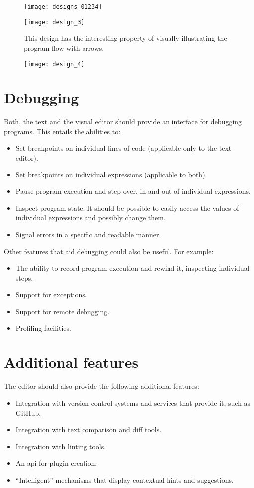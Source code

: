 \begin{figure}[h!]
\centering \texttt{[image: designs\_01234]}
\caption{}
\label{fig:designs_01234}
\end{figure}

\begin{figure}[h!]
\centering \texttt{[image: design\_3]}
\caption{This design has the interesting property of visually illustrating the
  program flow with arrows.}
\label{fig:design_3}
\end{figure}

\begin{figure}[h!]
\centering \texttt{[image: design\_4]}
\caption{}
\label{fig:design_4}
\end{figure}

\section{Debugging}
Both, the text and the visual editor should provide an interface for debugging programs. This entails the abilities to:
\begin{itemize}
\item Set breakpoints on individual lines of code (applicable only to the text editor).
\item Set breakpoints on individual expressions (applicable to both).
\item Pause program execution and step over, in and out of individual expressions.
\item Inspect program state. It should be possible to easily access the values of individual expressions and possibly change them.
\item Signal errors in a specific and readable manner.
\end{itemize}

Other features that aid debugging could also be useful. For example:
\begin{itemize}
\item The ability to record program execution and rewind it, inspecting individual steps.
\item Support for exceptions.
\item Support for remote debugging.
\item Profiling facilities.
\end{itemize}

\section{Additional features}
The editor should also provide the following additional features:
\begin{itemize}
\item Integration with version control systems and services that provide it, such as GitHub.
\item Integration with text comparison and diff tools.
\item Integration with linting tools. 
\item An \acrlong{api} for plugin creation.
\item ``Intelligent'' mechanisms that display contextual hints and suggestions.
\end{itemize}
 